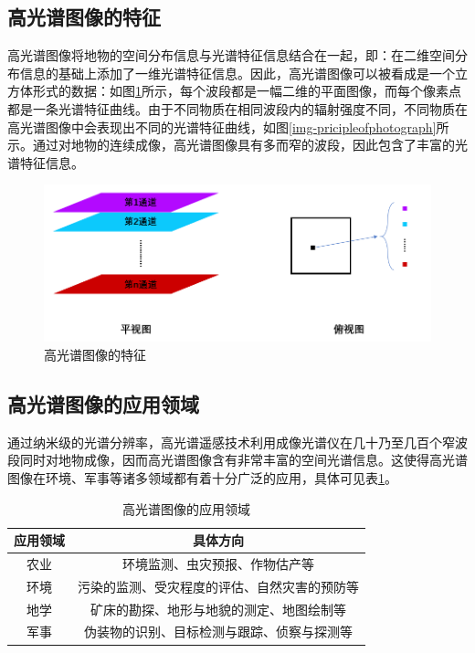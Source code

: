 \documentclass[12pt, a4paper]{article}
\begin{document}
\subsection{高光谱图像的特征}\label{introduction-feature}
\par 高光谱图像将地物的空间分布信息与光谱特征信息结合在一起，即：在二维空间分布信息的基础上添加了一维光谱特征信息。因此，高光谱图像可以被看成是一个立方体形式的数据：如图\ref{img-characterofphotograph}所示，每个波段都是一幅二维的平面图像，而每个像素点都是一条光谱特征曲线。由于不同物质在相同波段内的辐射强度不同，不同物质在高光谱图像中会表现出不同的光谱特征曲线\cite{howtogenanhsi}，如图\ref{img-pricipleofphotograph}所示。通过对地物的连续成像，高光谱图像具有多而窄的波段，因此包含了丰富的光谱特征信息。
\begin{figure}[h]
\centering
\includegraphics[scale=0.8]{img-characterofphotograph.png}
\caption{高光谱图像的特征}
\label{img-characterofphotograph}
\end{figure}
\subsection{高光谱图像的应用领域}
\par 通过纳米级的光谱分辨率，高光谱遥感技术利用成像光谱仪在几十乃至几百个窄波段同时对地物成像，因而高光谱图像含有非常丰富的空间光谱信息。这使得高光谱图像在环境、军事等诸多领域都有着十分广泛的应用\cite{usageofhsi-1}\cite{usageofhsi-2}\cite{usageofhsi-3}，具体可见表\ref{usageofhsi}。
\begin{table}[H]
\centering
\caption{高光谱图像的应用领域}
\label{usageofhsi}
\begin{tabular}{ c c }
\toprule
应用领域&具体方向\\
\toprule
农业&环境监测、虫灾预报、作物估产等\\
\hline
环境&污染的监测、受灾程度的评估、自然灾害的预防等\\
\hline
地学&矿床的勘探、地形与地貌的测定、地图绘制等\\
\hline
军事&伪装物的识别、目标检测与跟踪、侦察与探测等\\
\bottomrule
\end{tabular}
\end{table}
\end{document}
